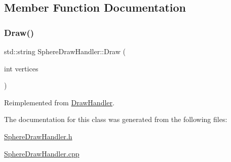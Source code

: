 \subsection{Member Function Documentation}
\mbox{\label{class_sphere_draw_handler_a2e94208cf2d1a86d5c5158d9bb9adf9e}} 
\subsubsection{\texorpdfstring{Draw()}{Draw()}}
{\footnotesize\ttfamily std\+::string Sphere\+Draw\+Handler\+::\+Draw (\begin{DoxyParamCaption}\item[{int}]{vertices }\end{DoxyParamCaption})\hspace{0.3cm}{\ttfamily [virtual]}}



Reimplemented from \mbox{\hyperlink{class_draw_handler_af52aafccdd1397441a17a2d36174a1e4}{Draw\+Handler}}.



The documentation for this class was generated from the following files\+:\begin{DoxyCompactItemize}
\item 
\mbox{\hyperlink{_sphere_draw_handler_8h}{Sphere\+Draw\+Handler.\+h}}\item 
\mbox{\hyperlink{_sphere_draw_handler_8cpp}{Sphere\+Draw\+Handler.\+cpp}}\end{DoxyCompactItemize}

